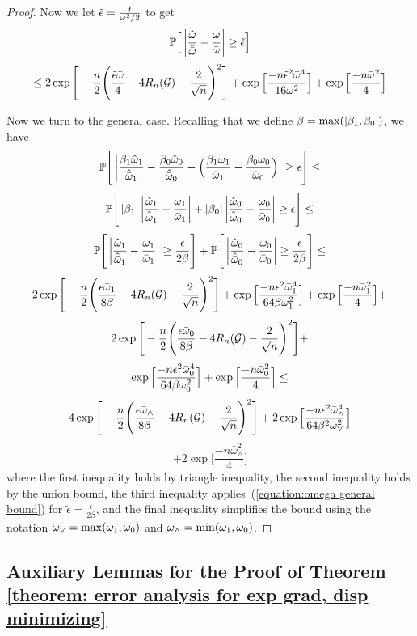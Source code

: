 \documentclass{article}
\begin{document}
\begin{proof}
Now we let $\tilde \epsilon = \frac{t}{\bar{\omega}^2/2}$ to get
\begin{equation} \label{equation:omega general bound}
   \mathbb{P} \Big[  \left| \frac{\hat{\omega}}{\hat{\bar{\omega}}} - \frac{\omega}{\bar{\omega}} \right|  \geq \tilde \epsilon \Big] 
\end{equation}
\[
\leq 2\exp\Bigg[-\frac{n}{2}\Bigg(\frac{\tilde \epsilon \bar{\omega}}{4}  - 4 R_n(\mathcal{G}) - \frac{2}{\sqrt{n}}\Bigg)^2 \Bigg] + \exp \Big[\frac{-n \tilde \epsilon^2 \bar{\omega}^4}{16\omega^2} \Big] +\exp\Big[\frac{-n\bar{\omega}^2}{4} \Big]
\]

Now we turn to the general case. 
Recalling that we define $\beta = \max(\left| \beta_1, \beta_0 \right|)$, we have
\[
\mathbb{P}\Bigg[  \left| \frac{\beta_1 \hat{\omega}_1 }{\hat{\bar{\omega}}_1} - \frac{\beta_0 \hat{\omega}_0}{\hat{\bar{\omega}}_0} -  \Big(\frac{\beta_1 \omega_1}{\bar{\omega}_1} - \frac{\beta_0 \omega_0}{\bar{\omega}_0} \Big) \right| \geq \epsilon \Bigg] \leq
\]
\[
\mathbb{P}\Bigg[  \left| \beta_1 \right|\left| \frac{ \hat{\omega}_1 }{\hat{\bar{\omega}}_1}  -  \frac{ \omega_1}{\bar{\omega}_1} \right| + \left| \beta_0 \right|\left| \frac{\hat{\omega}_0}{\hat{\bar{\omega}}_0} - \frac{\omega_0}{\bar{\omega}_0} \right| \geq \epsilon \Bigg] \leq
\]
\[
\mathbb{P}\Bigg[ \left| \frac{ \hat{\omega}_1 }{\hat{\bar{\omega}}_1}  -  \frac{ \omega_1}{\bar{\omega}_1} \right|  \geq \frac{\epsilon}{2\beta} \Bigg] + \mathbb{P}\Bigg[ \left| \frac{\hat{\omega}_0}{\hat{\bar{\omega}}_0} - \frac{\omega_0}{\bar{\omega}_0} \right| \geq \frac{\epsilon}{2\beta} \Bigg] \leq
\]
\[
2\exp\Bigg[-\frac{n}{2}\Bigg(\frac{\epsilon \bar{\omega}_1}{8\beta}  - 4 R_n(\mathcal{G}) - \frac{2}{\sqrt{n}}\Bigg)^2 \Bigg] + \exp \Big[\frac{-n \epsilon^2 \bar{\omega}_1^4}{64\beta\omega_1^2} \Big] +\exp\Big[\frac{-n\bar{\omega}_1^2}{4} \Big] +
\]
\[
2\exp\Bigg[-\frac{n}{2}\Bigg(\frac{\epsilon \bar{\omega}_0}{8\beta}  - 4 R_n(\mathcal{G}) - \frac{2}{\sqrt{n}}\Bigg)^2 \Bigg] + 
\]
\[
\exp \Big[\frac{-n \epsilon^2 \bar{\omega}_0^4}{64\beta\omega_0^2} \Big] +\exp\Big[\frac{-n\bar{\omega}_0^2}{4} \Big] \leq
\]
\[
4\exp\Bigg[-\frac{n}{2}\Bigg(\frac{\epsilon \bar{\omega}_{\wedge}}{8\beta}  - 4 R_n(\mathcal{G}) - \frac{2}{\sqrt{n}}\Bigg)^2 \Bigg] + 2\exp \Big[\frac{-n \epsilon^2 \bar{\omega}_{\wedge}^4}{64\beta^2\omega_{\vee}^2} \Big]
\]
\[
+2\exp\Big[\frac{-n\bar{\omega}_{\wedge}^2}{4} \Big]
\]
where the first inequality holds by triangle inequality, the second inequality holds by the union bound, the third inequality applies~(\ref{equation:omega general bound}) for $\tilde{\epsilon} = \frac{\epsilon}{2\beta}$, and the final inequality simplifies the bound using the notation $\omega_{\vee} = \max(\omega_1, \omega_0)$ and $\bar{\omega}_{\wedge} = \min(\bar{\omega}_1, \bar{\omega}_0)$.
\end{proof}

\subsection{Auxiliary Lemmas for the Proof of Theorem \ref{theorem: error analysis for exp grad, disp minimizing} }
\end{document}
